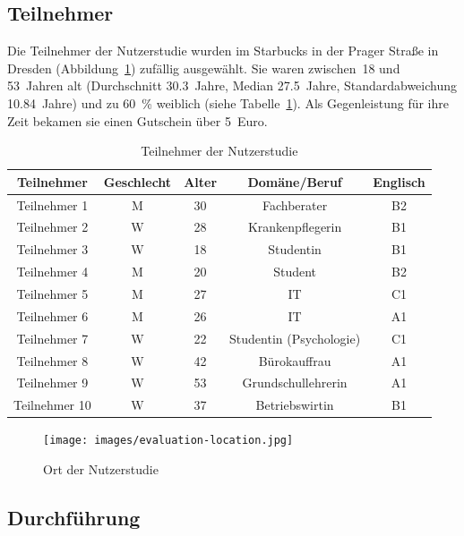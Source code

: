 \documentclass[
	headsepline,
	footsepline,
	fontsize=12pt,
	bibliography=totoc
]{scrbook}
\begin{document}
\subsection{Teilnehmer}

Die Teilnehmer der Nutzerstudie wurden im Starbucks in der Prager Straße in Dresden (Abbildung~\ref{figure:location}) zufällig ausgewählt. Sie waren zwischen~18 und 53~Jahren alt (Durchschnitt 30.3~Jahre, Median 27.5~Jahre, Standardabweichung 10.84~Jahre) und zu 60~\% weiblich (siehe Tabelle~\ref{table:evaluation-teilnehmer}). Als Gegenleistung für ihre Zeit bekamen sie einen Gutschein über 5~Euro.

\begin{table}[htbp]
	\centering
    \begin{tabular}{c|c|c|c|c}
    Teilnehmer   & Geschlecht & Alter & Domäne/Beruf & Englisch	 \\
    \hline
    Teilnehmer 1 & M          & 30    & Fachberater 			& B2 \\ 
    Teilnehmer 2 & W          & 28    & Krankenpflegerin 		& B1 \\ 
    Teilnehmer 3 & W          & 18    & Studentin  			& B1 \\ 
    Teilnehmer 4 & M          & 20    & Student  				& B2 \\ 
    Teilnehmer 5 & M          & 27    & IT 					& C1 \\ 
	Teilnehmer 6 & M          & 26    & IT 					& A1 \\ 
	Teilnehmer 7 & W          & 22    & Studentin (Psychologie)& C1 \\ 
	Teilnehmer 8 & W          & 42    & Bürokauffrau 			& A1 \\ 
	Teilnehmer 9 & W          & 53    & Grundschullehrerin 	& A1 \\ 
	Teilnehmer 10 & W         & 37    & Betriebswirtin 		& B1 \\ 
    \end{tabular}
    \caption{Teilnehmer der Nutzerstudie}
    \label{table:evaluation-teilnehmer}
\end{table}

\begin{figure}[htbp]
   \centering
   \texttt{[image: images/evaluation-location.jpg]}
   \caption{Ort der Nutzerstudie}
   \label{figure:location}
\end{figure}

\subsection{Durchführung}
\end{document}
